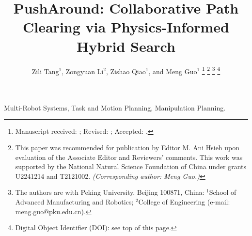 \documentclass[letterpaper, 10pt, journal, twoside]{IEEEtran}
\title{PushAround: Collaborative Path Clearing via Physics-Informed Hybrid Search}
\author{Zili Tang$^{1}$, Zongyuan Li$^{2}$, Zishao Qiao$^{1}$, and Meng Guo$^{1}$%
\thanks{Manuscript received: \RALReceivedDate; Revised: \RALRevisedDate;
Accepted: \RALAcceptedDate.}%
\thanks{This paper was recommended for publication by Editor M. Ani Hsieh
upon evaluation of the Associate Editor and Reviewers' comments.
This work was supported by the National Natural Science Foundation of China
under grants U2241214 and T2121002.
\textit{(Corresponding author: Meng Guo.)}}%
\thanks{The authors are with Peking University, Beijing 100871, China:
$^{1}$School of Advanced Manufacturing and Robotics;
$^{2}$College of Engineering (e-mail: meng.guo@pku.edu.cn).}%
\thanks{Digital Object Identifier (DOI): see top of this page.}}
\theoremstyle{definition}
\begin{document}
\maketitle





\begin{IEEEkeywords}
Multi-Robot Systems, Task and Motion Planning, Manipulation Planning.
\end{IEEEkeywords}









\end{document}
